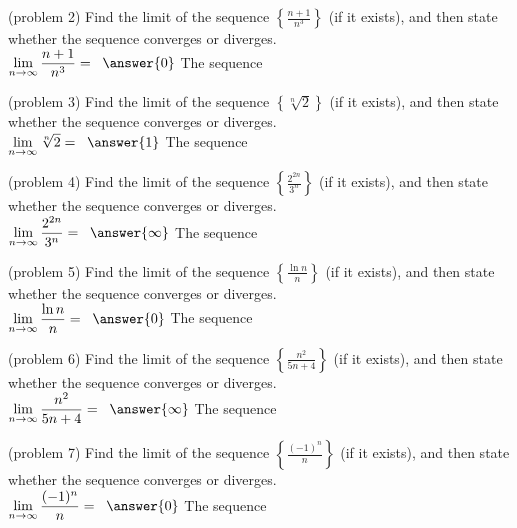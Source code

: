 \documentclass[handout]{ximera}
\begin{document}
\begin{problem}(problem 2)
Find the limit of the sequence $\displaystyle \left\{\frac{n+1}{n^3}\right\}$ (if it exists), and then state whether the sequence converges or diverges.\\
$\displaystyle \lim_{n\to \infty} \frac{n+1}{n^3} = \;\;\answer{0}$ \quad
The sequence 
\end{problem}

\begin{problem}(problem 3)
Find the limit of the sequence $\displaystyle \left\{\sqrt[n]{2}\right\}$ (if it exists), and then state whether the sequence converges or diverges.\\
$\displaystyle \lim_{n\to \infty} \sqrt[n]2 = \;\;\answer{1}$ \;\;
The sequence 
\end{problem}

\begin{problem}(problem 4)
Find the limit of the sequence $\displaystyle \left\{\frac{2^{2n}}{3^n}\right\}$ (if it exists), and then state whether the sequence converges or diverges.\\
$\displaystyle \lim_{n\to \infty} \frac{2^{2n}}{3^n} = \;\;\answer{\infty}$ \quad
The sequence 
\end{problem}

\begin{problem}(problem 5)
Find the limit of the sequence $\displaystyle \left\{\frac{\ln n}{n}\right\}$ (if it exists), and then state whether the sequence converges or diverges.\\
$\displaystyle \lim_{n\to \infty} \frac{\ln n}{n} = \;\;\answer{0}$ \quad
The sequence 
\end{problem}

\begin{problem}(problem 6)
Find the limit of the sequence $\displaystyle \left\{\frac{n^2}{5n+4}\right\}$ (if it exists), and then state whether the sequence converges or diverges.\\
$\displaystyle \lim_{n\to \infty} \frac{n^2}{5n+4} = \;\;\answer{\infty}$ \quad
The sequence 
\end{problem}

\begin{problem}(problem 7)
Find the limit of the sequence $\displaystyle \left\{\frac{(-1)^n}{n}\right\}$ (if it exists), and then state whether the sequence converges or diverges.\\
$\displaystyle \lim_{n\to \infty} \frac{(-1)^n}{n} = \;\;\answer{0}$ \quad
The sequence 
\end{problem}
\end{document}
